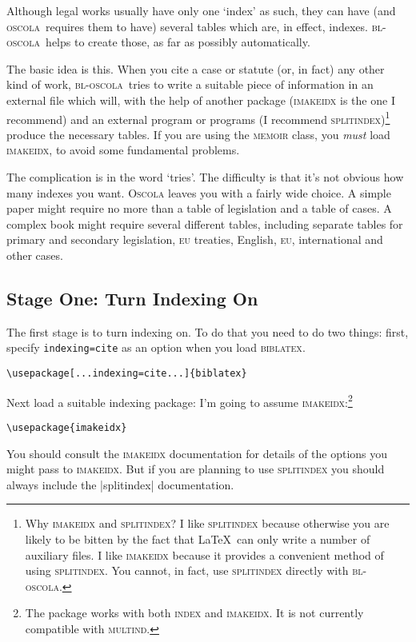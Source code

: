 \documentclass[a4paper,
               11pt,
	       DIV=1,			   
	       footinclude=false]
	      {scrartcl}
\newcommand{\oscola}{\textsc{bl-oscola}}
\newcommand{\biblatex}{\textsc{biblatex}}
\newcommand{\oscolashort}{\textsc{oscola}\nocite{oscola}}
\begin{document}
Although legal works usually have only one `index' as such, they can
have (and \oscolashort\ requires them to have) several
tables which are, in effect, indexes. \oscola\ helps to create those,
as far as possibly automatically.

The basic idea is this. When you cite a case or statute (or, in fact)
any other kind of work, \oscola\ tries to write a suitable piece of
information in an external file which will, with the help of another
package (\textsc{imakeidx} is the one I recommend) and an external
program or programs (I recommend \textsc{splitindex})\footnote{Why
\textsc{imakeidx} and \textsc{splitindex}? I like \textsc{splitindex}
because otherwise you are likely to be bitten by the fact that \LaTeX\
can only write a number of auxiliary files. I like \textsc{imakeidx}
because it provides a convenient method of using
\textsc{splitindex}. You cannot, in fact, use \textsc{splitindex}
directly with \oscola.} produce the necessary tables. If you are using the
\textsc{memoir} class, you \emph{must} load \textsc{imakeidx}, to avoid some
fundamental problems.

The complication is in the word `tries'. The difficulty is that it's
not obvious how many indexes you want. \textsc{Oscola} leaves you
with a fairly wide choice. A simple paper might require no more than a
table of legislation and a table of cases. A complex book might
require several different tables, including separate tables for
primary and secondary legislation, \textsc{eu} treaties, English,
\textsc{eu}, international and other cases. 

\subsection{Stage One: Turn Indexing On}

The first stage is to turn indexing on. To do that you need to do two
things: first, specify \texttt{indexing=cite} as an option when you
load \biblatex.
\begin{center}
\verb|\usepackage[...indexing=cite...]{biblatex}|
\end{center}

Next load a suitable indexing package: I'm going to assume \textsc{imakeidx}:\footnote{The package works with both \textsc{index} and \textsc{imakeidx}. It is not currently compatible with \textsc{multind}.}
\index[general]{imakeidx!recommended}
\begin{center}
\verb|\usepackage{imakeidx}|
\end{center}
You should consult the \textsc{imakeidx} documentation for details of
the options you might pass to \textsc{imakeidx}. But if you are
planning to use \textsc{splitindex} you should always include the
|splitindex| documentation.
\end{document}
